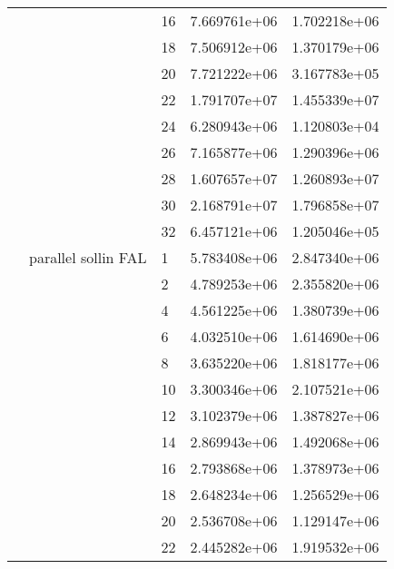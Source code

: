 \begin{tabular}{lllrr}
                      &                     & 16 &  7.669761e+06 &  1.702218e+06 \\
                      &                     & 18 &  7.506912e+06 &  1.370179e+06 \\
                      &                     & 20 &  7.721222e+06 &  3.167783e+05 \\
                      &                     & 22 &  1.791707e+07 &  1.455339e+07 \\
                      &                     & 24 &  6.280943e+06 &  1.120803e+04 \\
                      &                     & 26 &  7.165877e+06 &  1.290396e+06 \\
                      &                     & 28 &  1.607657e+07 &  1.260893e+07 \\
                      &                     & 30 &  2.168791e+07 &  1.796858e+07 \\
                      &                     & 32 &  6.457121e+06 &  1.205046e+05 \\
                      & parallel sollin FAL & 1  &  5.783408e+06 &  2.847340e+06 \\
                      &                     & 2  &  4.789253e+06 &  2.355820e+06 \\
                      &                     & 4  &  4.561225e+06 &  1.380739e+06 \\
                      &                     & 6  &  4.032510e+06 &  1.614690e+06 \\
                      &                     & 8  &  3.635220e+06 &  1.818177e+06 \\
                      &                     & 10 &  3.300346e+06 &  2.107521e+06 \\
                      &                     & 12 &  3.102379e+06 &  1.387827e+06 \\
                      &                     & 14 &  2.869943e+06 &  1.492068e+06 \\
                      &                     & 16 &  2.793868e+06 &  1.378973e+06 \\
                      &                     & 18 &  2.648234e+06 &  1.256529e+06 \\
                      &                     & 20 &  2.536708e+06 &  1.129147e+06 \\
                      &                     & 22 &  2.445282e+06 &  1.919532e+06 \\

\end{tabular}
